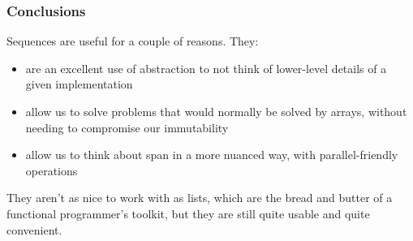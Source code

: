\documentclass[aspectratio=169]{beamer}
\newcommand{\fhex}[3][]{\node[hex, #1, fill=hexcolor, minimum width=0.4in] (#2) {#3}}
\begin{document}
\begin{frame}[fragile]
  \frametitle{Conclusions}

  Sequences are useful for a couple of reasons. They:
  \begin{itemize}
    \item are an excellent use of abstraction to not think of lower-level
    details of a given implementation
    \item allow us to solve problems that would normally be solved by arrays,
    without needing to compromise our immutability
    \item allow us to think about span in a more nuanced way, with parallel-friendly
    operations
  \end{itemize}

  \vspace{\fill}

  They aren't as nice to work with as lists, which are the bread and butter of
  a functional programmer's toolkit, but they are still quite usable and quite
  convenient.
\end{frame}












\end{document}
